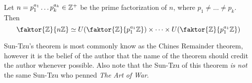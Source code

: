 \begin{corollary}
    Let $n=p_1^{a_1} \dots p_k^{a_k} \in \mathbb{Z}^+$ be the prime factorization of
    $n$, where  $p_1 \neq \dots \neq p_k$. Then
    \begin{equation*}
        \faktor{\Z}{n\Z} \simeq U(\faktor{\Z}{p_1^{a_1}\Z}) \times \dots \times
        U(\faktor{\Z}{p_1^{a_1}\Z})
    \end{equation*}
\end{corollary}

\begin{remark}
    Sun-Tzu's theorem is most commonly know as the Chines Remainder theorem,
    however it is the belief of the author that the name of the theorem should
    credit the author whenever possible. Also note that the Sun-Tzu of this
    theorem \textit{is not} the same Sun-Tzu who penned \textit{The Art of War}.
\end{remark}

